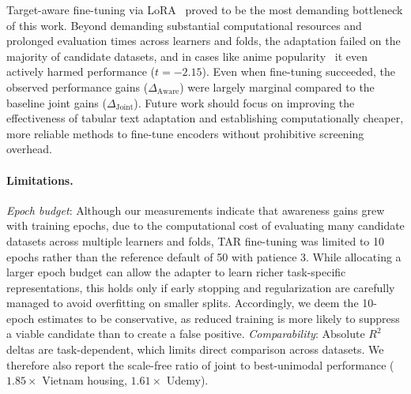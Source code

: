 \documentclass{article}
\newcommand{\djoint}{\Delta_{\text{Joint}}}
\newcommand{\daware}{\Delta_{\text{Aware}}}
\begin{document}
Target-aware fine-tuning via LoRA~\citep{lora} proved to be the most demanding bottleneck of this work. Beyond demanding substantial computational resources and prolonged evaluation times across learners and folds, the adaptation failed on the majority of candidate datasets, and in cases like anime popularity~\citep{dataset_anime_popularity} it even actively harmed performance ($t = -2.15$). Even when fine-tuning succeeded, the observed performance gains ($\daware$) were largely marginal compared to the baseline joint gains ($\djoint$). Future work should focus on improving the effectiveness of tabular text adaptation and establishing computationally cheaper, more reliable methods to fine-tune encoders without prohibitive screening overhead.


\paragraph{Limitations.} \emph{Epoch budget}: Although our measurements indicate that awareness gains grew with training epochs, due to the computational cost of evaluating many candidate datasets across multiple learners and folds, TAR fine-tuning was limited to 10 epochs rather than the reference default of 50 with patience 3. While allocating a larger epoch budget can allow the adapter to learn richer task-specific representations, this holds only if early stopping and regularization are carefully managed to avoid overfitting on smaller splits. Accordingly, we deem the 10-epoch estimates to be conservative, as reduced training is more likely to suppress a viable candidate than to create a false positive. \emph{Comparability}: Absolute $R^2$ deltas are task-dependent, which limits direct comparison across datasets. We therefore also report the scale-free ratio of joint to best-unimodal performance ($1.85\times$ Vietnam
housing, $1.61\times$ Udemy).
\end{document}
